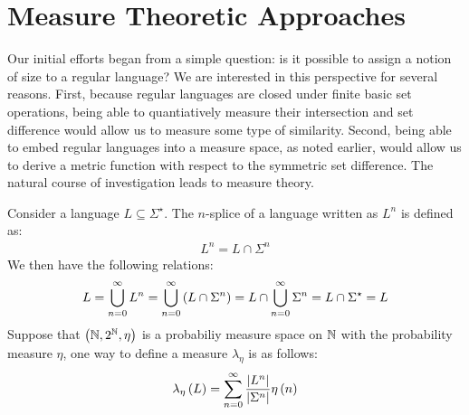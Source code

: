 
\section{Measure Theoretic Approaches}

Our initial efforts began from a simple question:
is it possible to assign a notion of size to a regular language?
We are interested in this perspective for several reasons.
First, because regular languages are closed under finite basic set operations,
being able to quantiatively measure their intersection and set
difference would allow us to measure some type of similarity.
Second, being able to embed regular languages into a measure space,
as noted earlier,
would allow us to derive a metric function with respect to the
symmetric set difference.
The natural course of investigation leads to measure theory.

Consider a language \(L \subseteq \Sigma^\star\).
The \(n\)-splice of a language written as \(L^n\) is defined as:
\begin{align*}
  L^n = L \cap \Sigma^n
\end{align*}
We then have the following relations:
\begin{align*}
  L
    = \bigcup_{n = 0}^{\infty} L^n
    = \bigcup_{n = 0}^{\infty} \left(L \cap \Sigma^n\right)
    = L \cap \bigcup_{n = 0}^{\infty} \Sigma^n
    = L \cap \Sigma^\star
    = L
\end{align*}
Suppose that \(\left(\mathbb{N}, 2^{\mathbb{N}}, \eta\right)\) is a probabiliy measure space
on \(\mathbb{N}\) with the probability measure \(\eta\),
one way to define a measure \(\lambda_{\eta}\)
is as follows:
\begin{align*}
  \lambda_{\eta} \left(L\right)
    = \sum_{n = 0}^{\infty}
        \frac{\left\lvert L^n\right\rvert}{\left\lvert\Sigma^n\right\rvert} \eta\left(n\right)
\end{align*}

